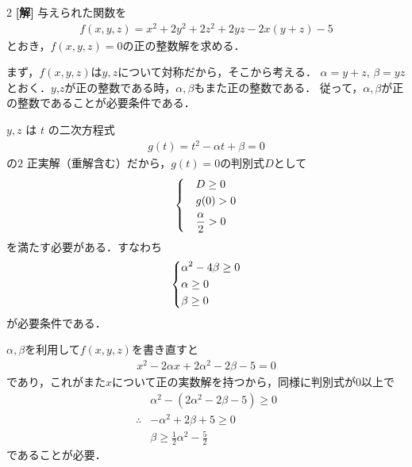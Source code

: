 \documentclass[../../../../main.tex]{subfiles}
\begin{document}
\setcounter{equation}{0}
\begin{oframed}
    
\end{oframed}
\setlength{\columnseprule}{0.4pt}
\begin{multicols}{2}
    {\bf[解]}
    与えられた関数を
    \begin{align*}
        f(x,y,z) = x^2+2y^2+2z^2+2yz-2x(y+z)-5
    \end{align*}
    とおき，$f(x,y,z)=0$の正の整数解を求める．

    まず，$f(x,y,z)$は$y,z$について対称だから，そこから考える．
    $\alpha=y+z$, $\beta=yz$ とおく．$y$,$z$が正の整数である時，$\alpha,\beta$もまた正の整数である．
    従って，$\alpha,\beta$が正の整数であることが必要条件である．

    $y,z$ は $t$ の二次方程式
    \begin{align*}
        g(t) = t^2-\alpha t+\beta=0
    \end{align*}
    の$2$ 正実解（重解含む）だから，$g(t)=0$の判別式$D$として
    \begin{align*}
        \begin{dcases}
             & D \ge 0              \\
             & g(0) > 0             \\
             & \frac{\alpha}{2} > 0
        \end{dcases}
    \end{align*}
    を満たす必要がある．すなわち
    \begin{align}
        \begin{dcases}
            \alpha^2-4\beta \ge 0 \\
            \alpha \ge 0          \\
            \beta \ge 0
        \end{dcases} \label{2001-1:eq:1}
    \end{align}
    が必要条件である．

    $\alpha,\beta$を利用して$f(x,y,z)$を書き直すと
    \begin{align*}
        x^2-2\alpha x+2\alpha^2-2\beta-5=0
    \end{align*}
    であり，これがまた$x$について正の実数解を持つから，同様に判別式が$0$以上で
    \begin{align}
         & \alpha^2-(2\alpha^2-2\beta-5) \ge 0                           \\
        \therefore
         & -\alpha^2+2\beta+5 \ge 0                                      \\
         & \beta \ge \frac{1}{2}\alpha^2-\frac{5}{2} \label{2001-1:eq:2}
    \end{align}
    であることが必要．


\end{multicols}
\end{document}
